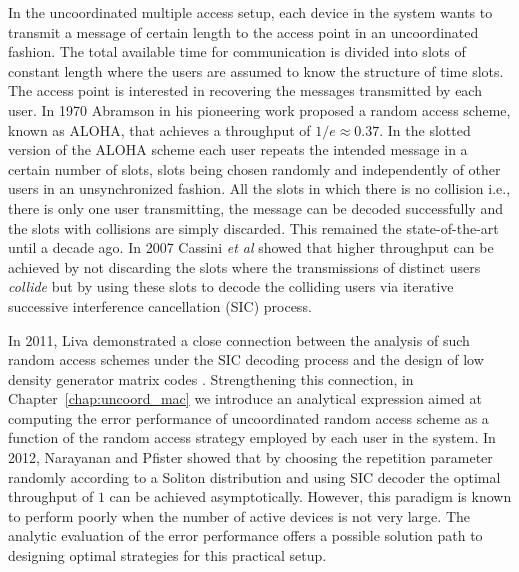 In the uncoordinated multiple access setup, each device in the system wants to transmit a message of certain length to the access point in an uncoordinated fashion. The total available time for communication is divided into slots of constant length where the users are assumed to know the structure of time slots. The access point is interested in recovering the messages transmitted by each user. In 1970 Abramson in his pioneering work \cite{abramson1970aloha} proposed a random access scheme, known as ALOHA, that achieves a throughput of $1/e\approx 0.37$. In the slotted version of the ALOHA scheme each user repeats the intended message in a certain number of slots, slots being chosen randomly and independently of other users in an unsynchronized fashion. All the slots in which there is no collision i.e., there is only one user transmitting, the message can be decoded successfully and the slots with collisions are simply discarded. This remained the state-of-the-art until a decade ago. In 2007 \cite{casini2007contention} Cassini \textit{et al} showed that higher throughput can be achieved by not discarding the slots where the transmissions of distinct users \textit{collide} but by using these slots to decode the colliding users via iterative successive interference cancellation (SIC) process. 

In 2011, Liva demonstrated a close connection between the analysis of such random access schemes under the SIC decoding process and the design of low density generator matrix codes \cite{liva2011graph}. Strengthening this connection, in Chapter~\ref{chap:uncoord_mac} we introduce an analytical expression aimed at computing the error performance of uncoordinated random access scheme as a function of the random access strategy employed by each user in the system. In 2012, Narayanan and Pfister showed that by choosing the repetition parameter randomly according to a Soliton distribution and using SIC decoder the optimal throughput of $1$ can be achieved asymptotically\cite{narayanan2012iterative}. However, this paradigm is known to perform poorly when the number of active devices is not very large. The analytic evaluation of the error performance offers a possible solution path to designing optimal strategies for this practical setup.

